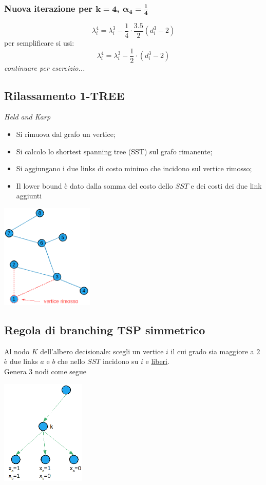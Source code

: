 \subsubsection{Nuova iterazione per $\boldsymbol{k=4}$, $\boldsymbol{\alpha_{4}=\frac{1}{4}}$}
\begin{equation*}
	\lambda_{i}^{4}=\lambda_{i}^{3}-\frac{1}{4}\cdot\frac{3.5}{2}(d_{i}^{3}-2)
\end{equation*}
per semplificare si usi:
\begin{equation*}
	\lambda_{i}^{4}=\lambda_{i}^{3}-\frac{1}{2}\cdot(d_{i}^{3}-2)
\end{equation*}
\textit{continuare per esercizio...}

\subsection{Rilassamento 1-TREE}
\textit{Held and Karp}
\begin{itemize}
	\item Si rimuova dal grafo un vertice;
	\item Si calcolo lo shortest spanning tree (SST) sul grafo rimanente;
	\item Si aggiungano i due links di costo minimo che incidono sul vertice rimosso;
	\item Il lower bound è dato dalla somma del costo dello $SST$ e dei costi dei due link aggiunti
\end{itemize}
\centerline{\includegraphics[height=5cm]{images/graph35.png}}
\subsection{Regola di branching TSP simmetrico}
Al nodo $K$ dell'albero decisionale: scegli un vertice $i$ il cui grado sia maggiore a $2$ è due links $a$ e $b$ che nello $SST$ incidono su $i$ e \underline{liberi}.\\
Genera $3$ nodi come segue\\
\centerline{\includegraphics[height=5cm]{images/graph36.png}}